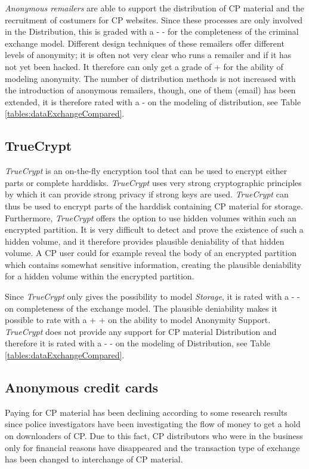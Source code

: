 \documentclass{sig-alternate-br}
\begin{document}
\textit{Anonymous remailers} are able to support the distribution of CP material and the recruitment of costumers for CP websites. Since these processes are only involved in the Distribution, this is graded with a - - for the completeness of the criminal exchange model. Different design techniques of these remailers offer different levels of anonymity; it is often not very clear who runs a remailer and if it has not yet been hacked. It therefore can only get a grade of + for the ability of modeling anonymity. The number of distribution methods is not increased with the introduction of anonymous remailers, though, one of them (email) has been extended, it is therefore rated with a - on the modeling of distribution, see Table \ref{tables:dataExchangeCompared}.

\subsection{TrueCrypt}
\textit{TrueCrypt} is an on-the-fly encryption tool that can be used to encrypt either parts or complete harddisks. \textit{TrueCrypt} uses very strong cryptographic principles \cite{miao2010research} by which it can provide strong privacy if strong keys are used. \textit{TrueCrypt} can thus be used to encrypt parts of the harddisk containing CP material for storage. Furthermore, \textit{TrueCrypt} offers the option to use hidden volumes within such an encrypted partition. It is very difficult to detect and prove the existence of such a hidden volume, and it therefore provides plausible deniability of that hidden volume. A CP user could for example reveal the body of an encrypted partition which contains somewhat sensitive information, creating the plausible deniability for a hidden volume within the encrypted partition.

Since \textit{TrueCrypt} only gives the possibility to model \textit{Storage}, it is rated with a - - on completeness of the exchange model. The plausible deniability makes it possible to rate with a + + on the ability to model Anonymity Support. \textit{TrueCrypt} does not provide any support for CP material Distribution and therefore it is rated with a - - on the modeling of Distribution, see Table \ref{tables:dataExchangeCompared}.

\subsection{Anonymous credit cards}
Paying for CP material has been declining according to some research results \cite{wortley2006child,wijk2009achter,beech2008internet} since police investigators have been investigating the flow of money to get a hold on downloaders of CP. Due to this fact, CP distributors who were in the business only for financial reasons have disappeared and the transaction type of exchange has been changed to interchange of CP material.
\end{document}
